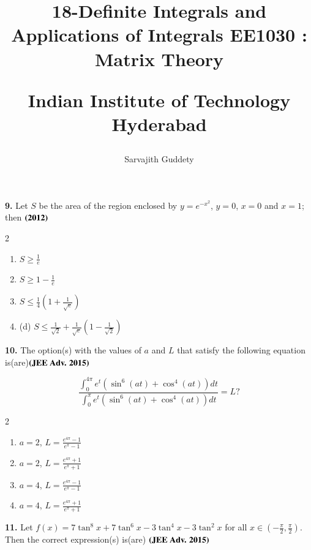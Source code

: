 \documentclass[journal,12pt,twocolumn]{IEEEtran}
\title{18-Definite Integrals and Applications of Integrals
\large{EE1030 : Matrix Theory}

Indian Institute of Technology Hyderabad
}
\author{Sarvajith Guddety}
\theoremstyle{remark}
\begin{document}
\maketitle







\noindent\textbf{9.} Let \( S \) be the area of the region enclosed by \( y = e^{-x^2} \), \( y = 0 \), \( x = 0 \) and \( x = 1 \); then $\hfill \textbf{(2012)}$

\begin{multicols}{2}
\begin{enumerate}
\item  [(a)] \( S \geq \frac{1}{e} \)
\item [(b)]\( S \geq 1 - \frac{1}{e} \)
\columnbreak
\item  [(c)] \( S \leq \frac{1}{4} \left( 1 + \frac{1}{\sqrt{e}} \right) \)
\item  (d) \( S \leq \frac{1}{\sqrt{2}} + \frac{1}{\sqrt{e}} \left( 1 - \frac{1}{\sqrt{2}} \right) \)
\end{enumerate}
\end{multicols}

   

   \noindent\textbf{10.} The option(s) with the values of $a$ and $L$ that satisfy the following equation is(are)$ \hfill \textbf{(JEE Adv. 2015)}$

   \[
   \frac{\int_0^{4\pi} e^t \left( \sin^6(at) + \cos^4(at) \right) dt}{\int_0^{\pi} e^t \left( \sin^6(at) + \cos^4(at) \right) dt} = L?
   \]

   \begin{multicols}{2}
   \begin{enumerate}
   \item  [(a)] $a = 2$, $L = \frac{e^{4\pi} - 1}{e^\pi - 1}$
   \item [(b)] $a = 2$, $L = \frac{e^{4\pi} + 1}{e^\pi + 1}$
   \columnbreak
   \item  [(c)] $a = 4$, $L = \frac{e^{4\pi} - 1}{e^\pi - 1}$
   \item [(d)] $a = 4$, $L = \frac{e^{4\pi} + 1}{e^\pi + 1}$
   \end{enumerate}
   \end{multicols}

   \noindent\textbf{11.} Let $f(x) = 7\tan^8x + 7\tan^6x - 3\tan^4x - 3\tan^2x$ for all $x \in \left( -\frac{\pi}{2}, \frac{\pi}{2} \right)$. \\
   Then the correct expression(s) is(are) $\hfill \hfill \textbf{(JEE Adv. 2015)}$
    
\end{document}
